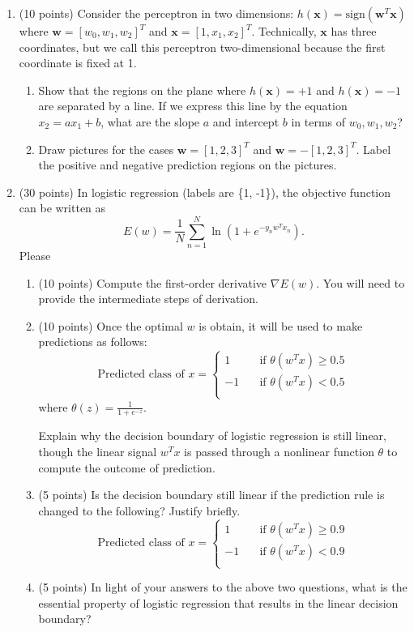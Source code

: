 \documentclass[11pt]{article}
\begin{document}
\begin{enumerate}
\item (10 points) Consider the perceptron in two dimensions:
$h(\boldsymbol x) = \mbox{sign}(\boldsymbol w^T \boldsymbol x)$
where $\boldsymbol w = [w_0, w_1, w_2]^T$ and $\boldsymbol x =
[1, x_1, x_2]^T$. Technically, $\boldsymbol x$ has three
coordinates, but we call this perceptron two-dimensional because
the first coordinate is fixed at 1.

\begin{enumerate}
    \item Show that the regions on the plane where $h(\boldsymbol
    x) = +1$ and $h(\boldsymbol x) = -1$ are separated by a line.
    If we express this line by the equation $x_2 = ax_1 + b$,
    what are the slope $a$ and intercept $b$ in terms of $w_0, w_1,
    w_2$?
    \item Draw pictures for the cases $\boldsymbol w=[1,2,3]^T$
    and $\boldsymbol w=-[1,2,3]^T$. Label the positive and negative
    prediction regions on the pictures.
\end{enumerate}

\item (30 points) In logistic regression (labels are \{1, -1\}),
the objective function  can be written as
$$E(w)=\frac{1}{N}\sum_{n=1}^N\ln\left(1+e^{-y_n
w^Tx_n}\right).$$ Please
\begin{enumerate}
\item (10 points) Compute the first-order derivative $\nabla E(w)$. You will
need to provide the intermediate steps of derivation.
\item (10 points) Once the optimal $w$ is obtain, it will be used to make
predictions as follows:
\[ \mbox{Predicted class of }x =
  \begin{cases}
    1       & \quad \text{if } \theta(w^Tx)\geq 0.5\\
    -1  & \quad \text{if } \theta(w^Tx)<0.5\\
  \end{cases}
\]
where $\theta(z)=\frac{1}{1+e^{-z}}$.

Explain why the decision boundary of logistic regression is still
linear, though the linear signal $w^Tx$ is passed through a
nonlinear function $\theta$ to compute the outcome of prediction.
\item (5 points) Is the decision boundary still linear if the prediction rule
is changed to the following? Justify briefly.
\[ \mbox{Predicted class of }x =
  \begin{cases}
    1       & \quad \text{if } \theta(w^Tx)\geq 0.9\\
    -1  & \quad \text{if } \theta(w^Tx)<0.9\\
  \end{cases}
\]
\item (5 points) In light of your answers to the above two questions, what is
the essential property of logistic regression that results in the
linear decision boundary?


\end{enumerate}
\end{enumerate}
\end{document}
